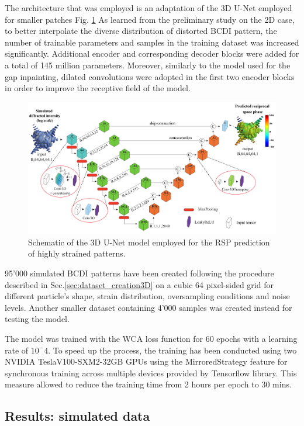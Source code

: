 The architecture that was employed is an adaptation of the 3D U-Net employed for smaller patches Fig. \ref{fig:architecture_phasing}
As learned from the preliminary study on the 2D case, to better interpolate the diverse distribution of distorted BCDI pattern, 
the number of trainable parameters and samples in the training dataset was increased significantly. Additional encoder 
and corresponding decoder blocks were added for a total of 145 million parameters. Moreover, similarly to the model 
used for the gap inpainting, dilated convolutions were adopted in the first two encoder blocks in order to improve 
the receptive field of the model. 

\begin{figure}[H]
    \centering
    \includegraphics[width=\textwidth]{figures/Phasing/Architecture-1.pdf}
    \caption{Schematic of the 3D U-Net model employed for the RSP prediction of highly strained patterns.}
    \label{fig:architecture_phasing}
\end{figure}

95'000 simulated BCDI patterns have been created following the procedure described in Sec.\ref{sec:dataset_creation3D} 
on a cubic 64 pixel-sided grid for different particle's shape, strain distribution, oversampling conditions and noise levels. 
Another smaller dataset containing 4'000 samples was created instead for testing the model. 

The model was trained with the WCA loss function for 60 epochs with a learning rate of $10^-4$. To speed up the process, 
the training has been conducted using two NVIDIA TeslaV100-SXM2-32GB GPUs using the MirroredStrategy feature for
synchronous training across multiple devices provided by Tensorflow library. This measure allowed to reduce the training 
time from 2 hours per epoch to 30 mins. 

\subsection{Results: simulated data}\label{chp:phasing_results}

